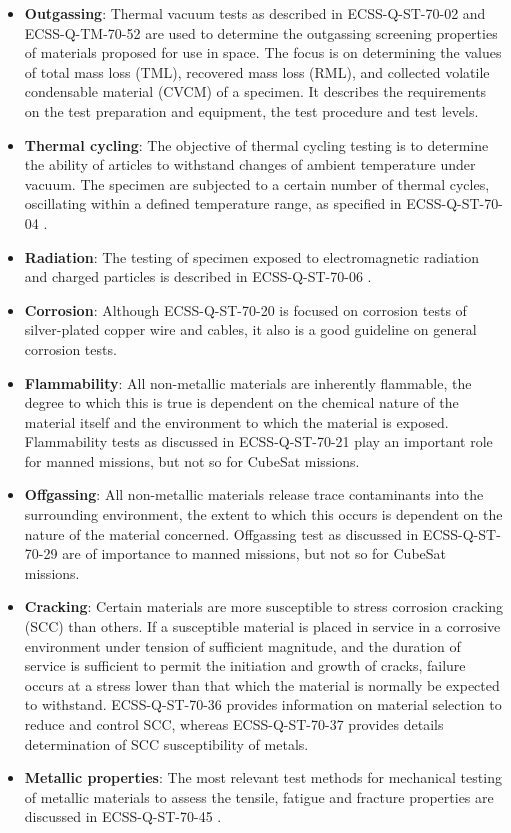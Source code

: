 \begin{itemize}
\item \textbf{Outgassing}: Thermal vacuum tests as described in ECSS-Q-ST-70-02 \cite{ECSS-Q-ST-70-02} and ECSS-Q-TM-70-52 \cite{ECSS-Q-TM-70-52} are used to determine the outgassing screening properties of materials proposed for use in space. The focus is on determining the values of total mass loss (TML), recovered mass loss (RML), and collected volatile condensable material (CVCM) of a specimen. It describes the requirements on the test preparation and equipment, the test procedure and test levels.
\item \textbf{Thermal cycling}: The objective of thermal cycling testing is to determine the ability of articles to withstand changes of ambient temperature under vacuum. The specimen are subjected to a certain number of thermal cycles, oscillating within a defined temperature range, as specified in ECSS-Q-ST-70-04 \cite{ECSS-Q-ST-70-04}.
\item \textbf{Radiation}: The testing of specimen exposed to electromagnetic radiation and charged particles is described in ECSS-Q-ST-70-06 \cite{ECSS-Q-ST-70-06}. 
\item \textbf{Corrosion}: Although ECSS-Q-ST-70-20 \cite{ECSS-Q-ST-70-20} is focused on corrosion tests of silver-plated copper wire and cables, it also is a good guideline on general corrosion tests.
\item \textbf{Flammability}: All non-metallic materials are inherently flammable, the degree to which this is true is dependent on the chemical nature of the material itself and the environment to which the material is exposed. Flammability tests as discussed in ECSS-Q-ST-70-21 \cite{ECSS-Q-ST-70-21} play an important role for manned missions, but not so for CubeSat missions.
\item \textbf{Offgassing}: All non-metallic materials release trace contaminants into the surrounding environment, the extent to which this occurs is dependent on the nature of the material concerned. Offgassing test as discussed in ECSS-Q-ST-70-29 \cite{ECSS-Q-ST-70-29} are of importance to manned missions, but not so for CubeSat missions.
\item \textbf{Cracking}: Certain materials are more susceptible to stress corrosion cracking (SCC) than others. If a susceptible material is placed in service in a corrosive environment under tension of sufficient magnitude, and the duration of service is sufficient to permit the initiation and growth of cracks, failure occurs at a stress lower than that which the material is normally be expected to withstand. ECSS-Q-ST-70-36 \cite{ECSS-Q-ST-70-36} provides information on material selection to reduce and control SCC, whereas ECSS-Q-ST-70-37 \cite{ECSS-Q-ST-70-37} provides details determination of SCC susceptibility of metals.
\item \textbf{Metallic properties}: The most relevant test methods for mechanical testing of metallic materials to assess the tensile, fatigue and fracture properties are discussed in ECSS-Q-ST-70-45 \cite{ECSS-Q-ST-70-45}.
\end{itemize}

